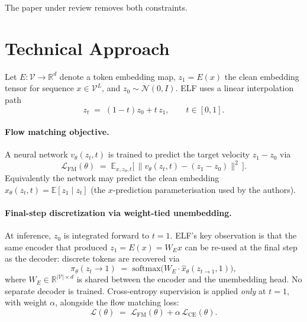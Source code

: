 \documentclass[11pt]{article}
\begin{document}
The paper under review removes both constraints.

\section*{Technical Approach}
\label{sec:method}

Let $E: \mathcal{V} \to \mathbb{R}^d$ denote a token embedding map, $z_1 = E(x)$ the clean embedding tensor for sequence $x \in \mathcal{V}^L$, and $z_0 \sim \mathcal{N}(0, I)$. ELF uses a linear interpolation path
\begin{equation}
z_t \;=\; (1 - t) z_0 + t \, z_1, \qquad t \in [0, 1].
\label{eq:path}
\end{equation}

\paragraph{Flow matching objective.}
A neural network $v_\theta(z_t, t)$ is trained to predict the target velocity $z_1 - z_0$ via
\begin{equation}
\mathcal{L}_{\text{FM}}(\theta) \;=\; \mathbb{E}_{x, z_0, t}\Big[\, \big\| v_\theta(z_t, t) - (z_1 - z_0) \big\|^2 \,\Big].
\label{eq:fm}
\end{equation}
Equivalently the network may predict the clean embedding $\hat{x}_\theta(z_t, t) = \mathbb{E}[z_1 \mid z_t]$ (the $x$-prediction parameterisation used by the authors).

\paragraph{Final-step discretization via weight-tied unembedding.}
At inference, $z_0$ is integrated forward to $t = 1$. ELF's key observation is that the same encoder that produced $z_1 = E(x) = W_E x$ can be re-used at the final step as the decoder: discrete tokens are recovered via
\begin{equation}
\pi_\theta(z_t \to 1) \;=\; \mathrm{softmax}\big( W_E \cdot \hat{x}_\theta(z_{t \to 1}, 1) \big),
\label{eq:decode}
\end{equation}
where $W_E \in \mathbb{R}^{|\mathcal{V}| \times d}$ is shared between the encoder and the unembedding head. No separate decoder is trained. Cross-entropy supervision is applied \emph{only} at $t = 1$, with weight $\alpha$, alongside the flow matching loss:
\begin{equation}
\mathcal{L}(\theta) \;=\; \mathcal{L}_{\text{FM}}(\theta) + \alpha \, \mathcal{L}_{\text{CE}}(\theta).
\end{equation}
\end{document}
